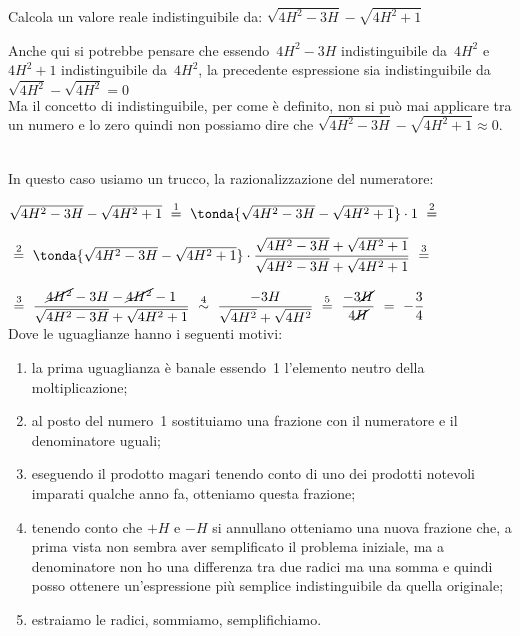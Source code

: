 \begin{esempio}
Calcola un valore reale indistinguibile da: \quad
\(\sqrt{4H^2 -3H} - \sqrt{4H^2 +1}\)

\begin{osservazione}
 Anche qui si potrebbe pensare che essendo~\(4H^2 -3H\) indistinguibile 
da~\(4H^2\) e~\(4H^2 +1\) indistinguibile da~\(4H^2\), la precedente 
espressione sia indistinguibile da \\
\(\sqrt{4H^2} - \sqrt{4H^2} = 0\)\\
Ma il concetto di indistinguibile, per come è definito, non si può mai 
applicare tra un numero e lo zero quindi non possiamo dire che 
\(\sqrt{4H^2 -3H} - \sqrt{4H^2 +1} \approx 0\).
\end{osservazione}\\

In questo caso usiamo un trucco, la razionalizzazione del numeratore:

\(\sqrt{4H^2 -3H} - \sqrt{4H^2 +1}
~ \stackrel{1}{=} ~
   \tonda{\sqrt{4H^2 -3H} - \sqrt{4H^2 +1}} \cdot 1 
~ \stackrel{2}{=} ~\)

\(~ \stackrel{2}{=} ~\tonda{\sqrt{4H^2 -3H}-\sqrt{4H^2 +1}} \cdot 
   \dfrac{\sqrt{4H^2 -3H}+\sqrt{4H^2 +1}}{\sqrt{4H^2 -3H}+\sqrt{4H^2+1}}
~ \stackrel{3}{=} ~\)

\(~ \stackrel{3}{=} ~
   \dfrac{\cancel{4H^2} -3H - \cancel{4H^2} -1}
         {\sqrt{4H^2 -3H}+\sqrt{4H^2+1}}
~ \stackrel{4}{\sim} ~
   \dfrac{-3H}{\sqrt{4H^2} + \sqrt{4H^2}}
~ \stackrel{5}{=} ~
   \dfrac{-3\cancel{H}}{4\cancel{H}}
~ \stackrel{}{=} ~
   -\dfrac{3}{4}\)\\

Dove le uguaglianze hanno i seguenti motivi:
\begin{enumerate} [nosep]
 \item la prima uguaglianza è banale essendo~1 l'elemento 
neutro della moltiplicazione; 
 \item al posto del numero~1 sostituiamo una frazione con 
il numeratore e il denominatore uguali; 
 \item eseguendo il prodotto magari tenendo conto di uno 
dei prodotti notevoli imparati qualche anno fa, otteniamo questa 
frazione;
 \item tenendo conto che \(+H\) e \(-H\) si annullano 
otteniamo una nuova frazione che, a prima vista non sembra 
aver semplificato il problema iniziale, 
ma a denominatore non ho una differenza tra due radici 
ma una somma e quindi posso ottenere un'espressione più semplice 
indistinguibile da quella originale;
 \item estraiamo le radici, sommiamo, semplifichiamo.
\end{enumerate}
\end{esempio}

